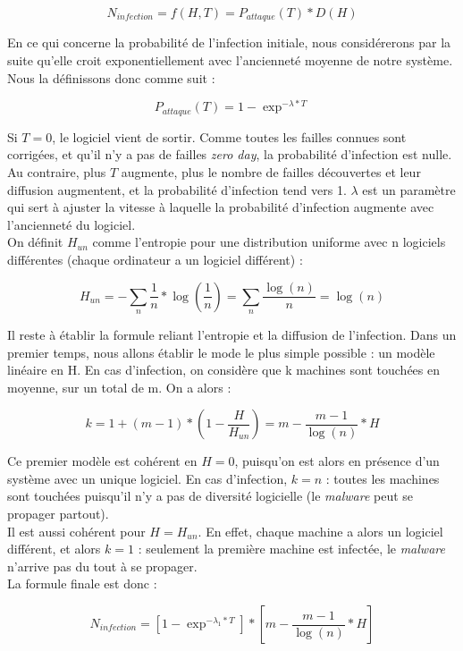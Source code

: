 \[
N_{infection} = f(H,T) = P_{attaque}(T)*D(H)
\]

En ce qui concerne la probabilité de l'infection initiale, nous considérerons par la suite qu'elle croit exponentiellement avec l'ancienneté moyenne de notre système. Nous la définissons donc comme suit :

\[
P_{attaque}(T) =1- \exp^{-\lambda*T}
\]

Si $T=0$, le logiciel vient de sortir. Comme toutes les failles connues sont corrigées, et qu'il n'y a pas de failles \textit{zero day}, la probabilité d'infection est nulle. Au contraire, plus $T$ augmente, plus le nombre de failles découvertes et leur diffusion augmentent, et la probabilité d'infection tend vers 1. $\lambda$ est un paramètre qui sert à ajuster la vitesse à laquelle la probabilité d'infection augmente avec l'ancienneté du logiciel.\\

On définit $H_{un}$ comme l'entropie pour une distribution uniforme avec n logiciels différentes (chaque ordinateur a un logiciel différent) :

\[
H_{un} = -\sum_n \frac{1}{n} * \log(\frac{1}{n}) = \sum_n \frac{\log(n)}{n} = \log(n)
\]

Il reste à établir la formule reliant l'entropie et la diffusion de l'infection. Dans un premier temps, nous allons établir le mode le plus simple possible : un modèle linéaire en H. En cas d'infection, on considère que k machines sont touchées en moyenne, sur un total de m. On a alors :

\[
k=1+(m-1)*(1-\frac{H}{H_{un}}) =m-\frac{m-1}{\log(n)}*H
\]

Ce premier modèle est cohérent en $H=0$, puisqu'on est alors en présence d'un système avec un unique logiciel. En cas d'infection, $k=n$ : toutes les machines sont touchées puisqu'il n'y a pas de diversité logicielle (le \textit{malware} peut se propager partout).\\
Il est aussi cohérent pour $H=H_{un}$. En effet, chaque machine a alors un logiciel différent, et alors $k=1$ : seulement la première machine est infectée, le \textit{malware} n'arrive pas du tout à se propager.\\
La formule finale est donc :


\[
N_{infection}=[1-\exp^{-\lambda_1*T}] * [m-\frac{m-1}{\log(n)}*H]
\]

